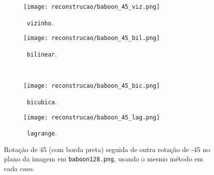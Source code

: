 \begin{figure}[H]
    \centering
    \begin{subfigure}{0.33\textwidth}
        \centering
        \texttt{[image: reconstrucao/baboon\_45\_viz.png]}
        \caption{~\texttt{vizinho}.}
    \end{subfigure}%
    \hspace{8pt}
    \begin{subfigure}{0.33\textwidth}
        \centering
        \texttt{[image: reconstrucao/baboon\_45\_bil.png]}
        \caption{~\texttt{bilinear}.}
    \end{subfigure}
    \\[8pt]
    \begin{subfigure}{0.33\textwidth}
        \centering
        \texttt{[image: reconstrucao/baboon\_45\_bic.png]}
        \caption{~\texttt{bicubica}.}
    \end{subfigure}%
    \hspace{8pt}%
    \begin{subfigure}{0.33\textwidth}
        \centering
        \texttt{[image: reconstrucao/baboon\_45\_lag.png]}
        \caption{~\texttt{lagrange}.}
    \end{subfigure}

    \caption{Rotação de 45\textdegree{} (com borda preta) seguida de outra rotação de -45\textdegree{} no plano da imagem em \texttt{baboon128.png}, usando o mesmo método em cada caso.}
    \label{fig:rec:45}
\end{figure}